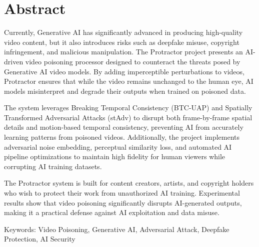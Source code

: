 \chapter*{Abstract}
\label{chap:abstract}

Currently, Generative AI has significantly advanced in producing high-quality video content, but it also introduces risks such as deepfake misuse, copyright infringement, and malicious manipulation. The Protractor project presents an AI-driven video poisoning processor designed to counteract the threats posed by Generative AI video models. By adding imperceptible perturbations to videos, Protractor ensures that while the video remains unchanged to the human eye, AI models misinterpret and degrade their outputs when trained on poisoned data.

The system leverages Breaking Temporal Consistency (BTC-UAP) and Spatially Transformed Adversarial Attacks (stAdv) to disrupt both frame-by-frame spatial details and motion-based temporal consistency, preventing AI from accurately learning patterns from poisoned videos. Additionally, the project implements adversarial noise embedding, perceptual similarity loss, and automated AI pipeline optimizations to maintain high fidelity for human viewers while corrupting AI training datasets.

The Protractor system is built for content creators, artists, and copyright holders who wish to protect their work from unauthorized AI training. Experimental results show that video poisoning significantly disrupts AI-generated outputs, making it a practical defense against AI exploitation and data misuse.

Keywords: Video Poisoning, Generative AI, Adversarial Attack, Deepfake Protection, AI Security